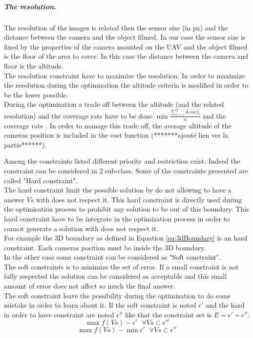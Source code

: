 \subparagraph{The resolution.}
The resolution of the images is related then the sensor size (in px) and  the distance between the camera and the object filmed. In our case the sensor size is fixed by the properties of the camera mounted on the UAV and the object filmed is the floor of the area to cover. In this case the distance between the camera and floor is the altitude. \\
The resolution constraint have to maximize the resolution. In order to maximize the resolution during the optimization the altitude criteria is modified in order to be the lower possible.\\
During the optimization a trade off between the altitude (and the related resolution) and the coverage rate have to be done $\min{\frac{\sum^n_{i=1}{A.coef_i}}{n}}$ and the coverage rate . In order to manage this trade off, the average altitude of the cameras position is included in the cost function (*******ajouté lien ver la partie******). 
 

 
Among the constraints listed different priority and restriction exist. Indeed the constraint can be considered in 2 sub-class. 
 Some of the constraints presented are called "Hard constraint". \\
 The hard constraint limit the possible solution by do not allowing to have a answer $Vs$ with does not respect it. This hard constraint is directly used during the optimisation process to prohibit any solution to be out of this boundary. This hard constraint have to be integrate in the optimization process in order to cannot  generate a solution with does not respect it. \\ 
 For example the 3D boundary as defined in Equation \ref{eq:3dBoundary} is an hard constraint. Each cameras position must be inside the 3D boundary.\\
 
 In the other case some constraint can be considered as "Soft constraint".\\ 
 The soft constraints is to minimize the set of error. If a small constraint is not fully respected the solution can be considered as acceptable and this small amount of error does not affect so much the final answer. \\
 The soft constraint leave the possibility during the optimization to do some mistake in order to learn about it.  
 If the soft constraint is noted $\epsilon'$ and the hard in order to have constraint are noted $\epsilon''$ like that the constraint set is $E=\epsilon'+\epsilon''$.
 \begin{equation}
 	\max f(Vs) -\epsilon'  \mbox{  } \forall Vs \subset \epsilon''
 \end{equation}
  \begin{equation}
 	\max f(Vs) - \min \epsilon'  \mbox{  } \forall Vs \subset \epsilon''
 \end{equation}

